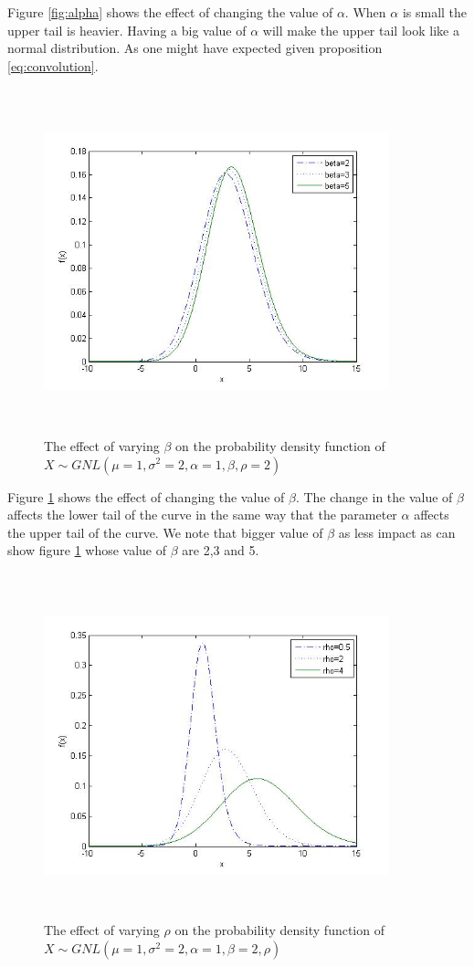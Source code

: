 \documentclass[12pt,travaildirige,nobabel, twoside]{dms}
\numberwithin{equation}{section}
\numberwithin{table}{chapter}
\numberwithin{figure}{chapter}
\begin{document}
Figure \ref{fig:alpha} shows the effect of changing the value of $\alpha$. When $\alpha$ is small the upper tail is heavier. Having a big value of $\alpha$ will make the upper tail look like a normal distribution. As one might have expected given proposition \ref{eq:convolution}.\\


\begin{figure}[h!]
\caption {The effect of varying $\beta$ on the probability density function of $X\sim GNL(\mu=1,\sigma^2=2,\alpha=1,\beta,\rho=2)$}\label{fig:beta}
  \includegraphics[width=10cm,height=10cm,keepaspectratio]{beta.jpg}
\end{figure}

Figure \ref{fig:beta} shows the effect of changing the value of $\beta$. The change in the value of $\beta$ affects the lower tail of the curve in the same way that the parameter $\alpha$ affects the upper tail of the curve. We note that bigger value of $\beta$ as less impact as can show figure \ref{fig:beta} whose value of $\beta$ are 2,3 and 5.\\

\begin{figure}[h!]
\caption {The effect of varying $\rho$ on the probability density function of  $X\sim GNL(\mu=1,\sigma^2=2,\alpha=1,\beta=2,\rho)$}\label{fig:rho}
\includegraphics[width=10cm,height=10cm,keepaspectratio]{rho.jpg}
\end{figure}
\end{document}
